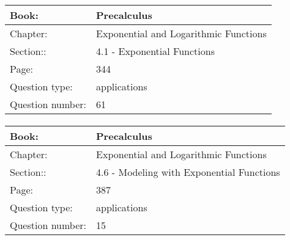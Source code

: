 \documentclass{article}
\begin{document}
            \paragraph{}
            \begin{tabularx}{1\textwidth}{
                    p{}
                    p{}
                }
                \toprule
                Book: & Precalculus
                \\
                \midrule
                Chapter: & Exponential and Logarithmic Functions
                \\
                \midrule
                Section:: & 4.1 - Exponential Functions
                \\
                \midrule
                Page: & 344
                \\
                \midrule
                Question type: & applications
                \\
                \midrule
                Question number: & 61
                \\
                \bottomrule
            \end{tabularx}
            
            \paragraph{}
            \begin{tabularx}{1\textwidth}{
                    p{}
                    p{}
                }
                \toprule
                Book: & Precalculus
                \\
                \midrule
                Chapter: & Exponential and Logarithmic Functions
                \\
                \midrule
                Section:: & 4.6 - Modeling with Exponential Functions
                \\
                \midrule
                Page: & 387
                \\
                \midrule
                Question type: & applications
                \\
                \midrule
                Question number: & 15
                \\
                \bottomrule
            \end{tabularx}
            
\end{document}

